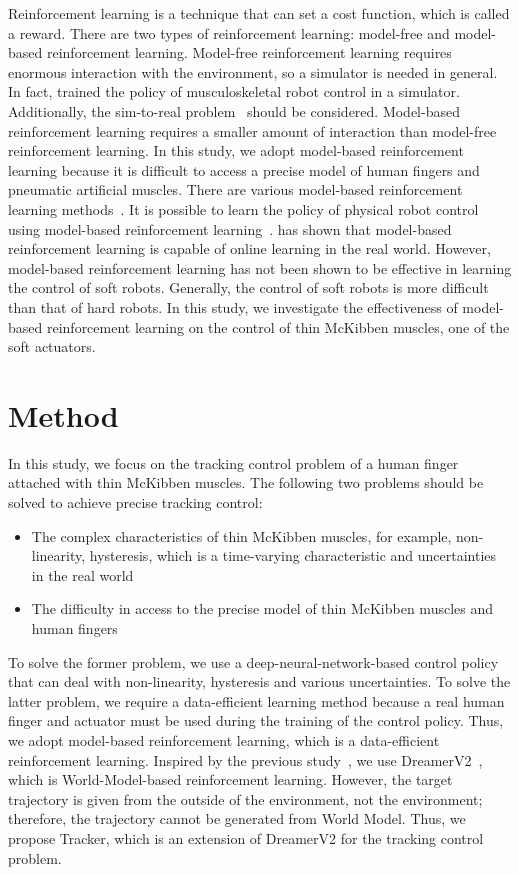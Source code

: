 \documentclass[letterpaper, 10 pt, conference]{ieeeconf}  %
\begin{document}
Reinforcement learning is a technique that can set a cost function, which is called a reward. There are two types of reinforcement learning: model-free and model-based reinforcement learning. Model-free reinforcement learning requires enormous interaction with the environment, so a simulator is needed in general. In fact, \cite{fan2020humanoid} trained the policy of musculoskeletal robot control in a simulator. Additionally, the sim-to-real problem~\cite{zhao2020sim} should be considered. Model-based reinforcement learning requires a smaller amount of interaction than model-free reinforcement learning. In this study, we adopt model-based reinforcement learning because it is difficult to access a precise model of human fingers and pneumatic artificial muscles. There are various model-based reinforcement learning methods~\cite{ha2018world, Hafner2020Dream, hafner2020mastering}. It is possible to learn the policy of physical robot control using model-based reinforcement learning~\cite{wu2022daydreamer}. \cite{wu2022daydreamer} has shown that model-based reinforcement learning is capable of online learning in the real world. However, model-based reinforcement learning has not been shown to be effective in learning the control of soft robots. Generally, the control of soft robots is more difficult than that of hard robots. In this study, we investigate the effectiveness of model-based reinforcement learning on the control of thin McKibben muscles, one of the soft actuators.

\section{Method}
In this study, we focus on the tracking control problem of a human finger attached with thin McKibben muscles. The following two problems should be solved to achieve precise tracking control:
\begin{itemize}
    \item The complex characteristics of thin McKibben muscles, for example, non-linearity, hysteresis, which is a time-varying characteristic and uncertainties in the real world
    \item The difficulty in access to the precise model of thin McKibben muscles and human fingers
\end{itemize}
To solve the former problem, we use a deep-neural-network-based control policy that can deal with non-linearity, hysteresis and various uncertainties. To solve the latter problem, we require a data-efficient learning method because a real human finger and actuator must be used during the training of the control policy. Thus, we adopt model-based reinforcement learning, which is a data-efficient reinforcement learning. Inspired by the previous study~\cite{wu2022daydreamer}, we use DreamerV2~\cite{Hafner2020Dream}, which is World-Model-based reinforcement learning. However, the target trajectory is given from the outside of the environment, not the environment; therefore, the trajectory cannot be generated from World Model. Thus, we propose Tracker, which is an extension of DreamerV2 for the tracking control problem.
\end{document}
